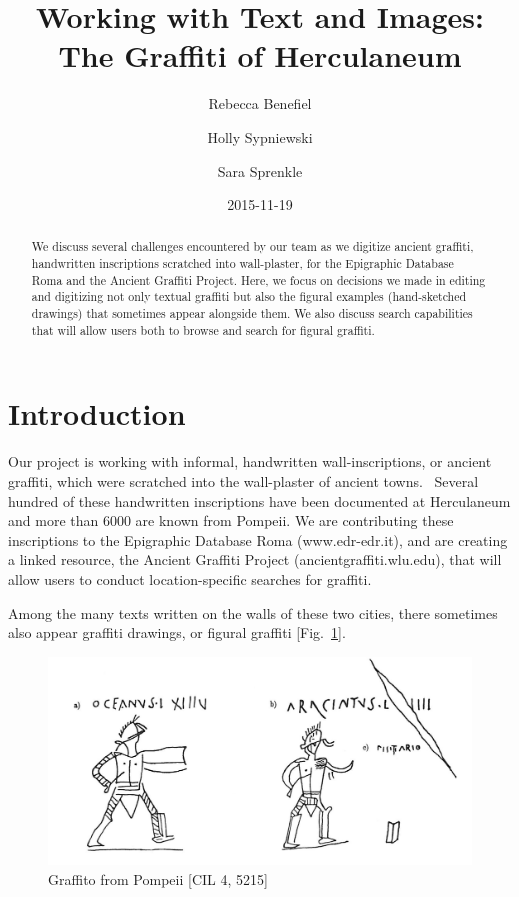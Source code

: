 \documentclass[amsthm,ebook]{saparticle}
\title{Working with Text and Images: The Graffiti of Herculaneum}
\author[WL]{Rebecca Benefiel\corref{first}}
\author[Millisaps]{Holly Sypniewski}
\author[WL]{Sara Sprenkle}\date{2015-11-19}
\begin{document}
\maketitle
\begin{abstract}
We discuss several challenges encountered by our team as we digitize ancient graffiti, handwritten inscriptions scratched into wall-plaster, for the Epigraphic Database Roma and the Ancient Graffiti Project. Here, we focus on decisions we made in editing and digitizing not only textual graffiti but also the figural examples (hand-sketched drawings) that sometimes appear alongside them. We also discuss search capabilities that will allow users both to browse and search for figural graffiti.
\end{abstract}

\section{Introduction}

\noindent Our project is working with informal, handwritten wall-inscriptions, or ancient graffiti, which were scratched into the
wall-plaster of ancient towns. \ Several hundred of these handwritten inscriptions have been documented at Herculaneum
and more than 6000 are known from Pompeii. We are contributing these inscriptions to the Epigraphic Database Roma
(www.edr-edr.it), and are creating a linked resource, the Ancient Graffiti Project (ancientgraffiti.wlu.edu), that will
allow users to conduct location-specific searches for graffiti. 

Among the many texts written on the walls of these two cities, there sometimes also appear graffiti drawings, or figural
graffiti [Fig.~\ref{fig:1}]. 

\begin{figure}[!bp]
\centering
 \includegraphics[width=\columnwidth]{EAGLE2016BenefielSypniewski-img001.jpg}
\caption{ Graffito from Pompeii [CIL 4, 5215]}
\label{fig:1}
\end{figure}
\end{document}
